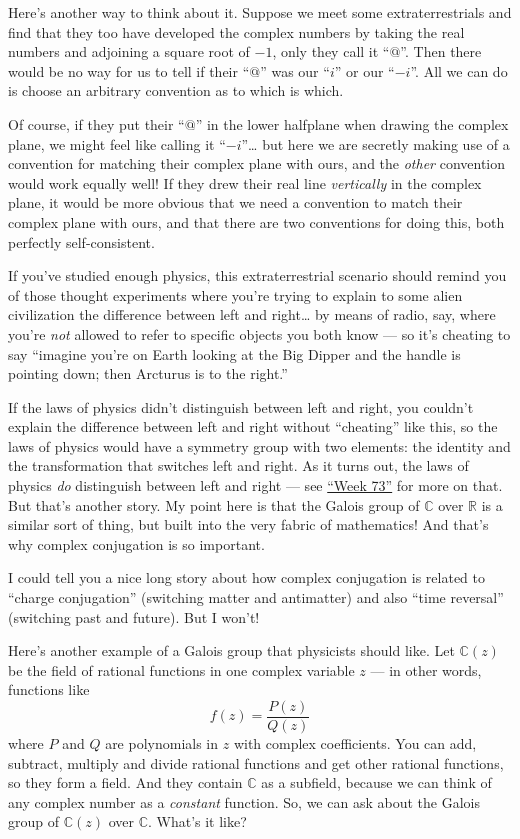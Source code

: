 \documentclass{article}
\begin{document}
Here's another way to think about it. Suppose we meet some
extraterrestrials and find that they too have developed the complex
numbers by taking the real numbers and adjoining a square root of
\(-1\), only they call it ``\(@\)''. Then there would be no way for us
to tell if their ``\(@\)'' was our ``\(i\)'' or our ``\(-i\)''. All we
can do is choose an arbitrary convention as to which is which.

Of course, if they put their ``\(@\)'' in the lower halfplane when
drawing the complex plane, we might feel like calling it
``\(-i\)''\ldots{} but here we are secretly making use of a convention
for matching their complex plane with ours, and the \emph{other}
convention would work equally well! If they drew their real line
\emph{vertically} in the complex plane, it would be more obvious that we
need a convention to match their complex plane with ours, and that there
are two conventions for doing this, both perfectly self-consistent.

If you've studied enough physics, this extraterrestrial scenario should
remind you of those thought experiments where you're trying to explain
to some alien civilization the difference between left and right\ldots{}
by means of radio, say, where you're \emph{not} allowed to refer to
specific objects you both know --- so it's cheating to say ``imagine
you're on Earth looking at the Big Dipper and the handle is pointing
down; then Arcturus is to the right.''

If the laws of physics didn't distinguish between left and right, you
couldn't explain the difference between left and right without
``cheating'' like this, so the laws of physics would have a symmetry
group with two elements: the identity and the transformation that
switches left and right. As it turns out, the laws of physics \emph{do}
distinguish between left and right --- see
\protect\hyperlink{week73}{``Week 73''} for more on that. But that's
another story. My point here is that the Galois group of \(\mathbb{C}\)
over \(\mathbb{R}\) is a similar sort of thing, but built into the very
fabric of mathematics! And that's why complex conjugation is so
important.

I could tell you a nice long story about how complex conjugation is
related to ``charge conjugation'' (switching matter and antimatter) and
also ``time reversal'' (switching past and future). But I won't!

Here's another example of a Galois group that physicists should like.
Let \(\mathbb{C}(z)\) be the field of rational functions in one complex
variable \(z\) --- in other words, functions like
\[f(z) = \frac{P(z)}{Q(z)}\] where \(P\) and \(Q\) are polynomials in
\(z\) with complex coefficients. You can add, subtract, multiply and
divide rational functions and get other rational functions, so they form
a field. And they contain \(\mathbb{C}\) as a subfield, because we can
think of any complex number as a \emph{constant} function. So, we can
ask about the Galois group of \(\mathbb{C}(z)\) over \(\mathbb{C}\).
What's it like?
\end{document}
